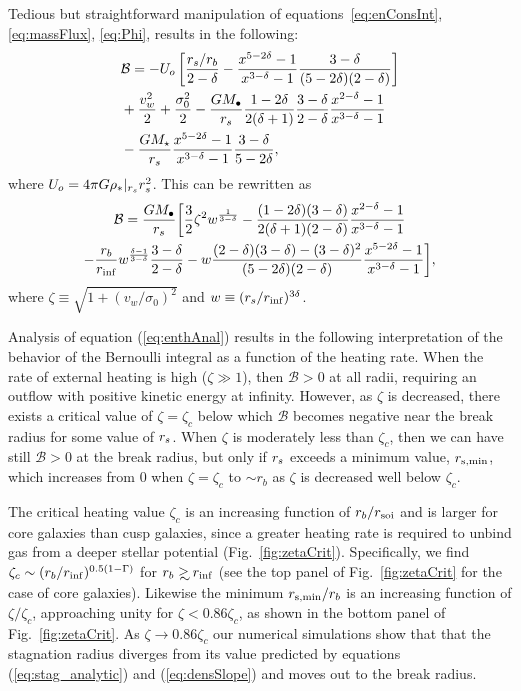 Tedious but straightforward manipulation of equations~\eqref{eq:enConsInt}, \eqref{eq:massFlux}, \eqref{eq:Phi}, results in the following:
\begin{align}
  &\mathcal{B} = -U_o\left[\frac{r_s/r_b}{2-\delta}-\frac{x^{5-2\delta}-1}{x^{3-\delta}-1}\frac{3-\delta}{(5-2\delta)(2-\delta)}\right]\nonumber\\
  &+\frac{v_w^2}{2}+\frac{\sigma_0^2}{2}- \frac{G M_{\bullet}}{r_s}
  \frac{1-2\delta}{2(\delta+1)}
  \frac{3-\delta}{2-\delta}\frac{x^{2-\delta}-1}{x^{3-\delta}-1}
  \nonumber\\
  &-\frac{G M_\star}{r_s}
  \frac{x^{5-2\delta}-1}{x^{3-\delta}-1}\frac{3-\delta}{5-2\delta},
\end{align}
where $U_o=4 \pi G \rho_*|_{r_s} r_s^2$.  This can be rewritten as
\begin{multline}
  \mathcal{B} =\frac{G M_{\bullet}}{r_s} \biggl[ \frac{3}{2} \zeta^2
  w^{\frac{1}{3 -\delta}}
  -\frac{(1-2\delta)(3-\delta)}{2(\delta+1)(2-\delta)}  \frac{x^{2  -\delta}-1}{x^{3-\delta}-1}\\
  -\frac{r_b}{r_{\rm inf}} w^{\frac{\delta-1}{3-\delta}} \frac{3 -\delta}{2
    -\delta} -w
  \frac{(2-\delta)(3-\delta)-(3-\delta)^{2}}{(5-2\delta)(2-\delta)}
  \frac{x^{5-2\delta}-1}{x^{3-\delta}-1} \biggr],
\label{eq:enthAnal}
\end{multline}
where $\zeta \equiv \sqrt{1 + (v_w/\sigma_0)^2}$ and $w\equiv
(r_s/r_{\rm inf})^{3\delta}$.

Analysis of equation (\ref{eq:enthAnal}) results in the following interpretation of the behavior of the Bernoulli integral as a function of the heating rate.  When the rate of external heating is high ($\zeta \gg 1$), then $\mathcal{B} > 0$ at all radii, requiring an outflow with positive kinetic energy at infinity.  However, as $\zeta$ is decreased, there exists a critical value of $\zeta = \zeta_{c}$ below which $\mathcal{B}$ becomes negative near the break radius for some value of $r_s$.  When $\zeta$ is moderately less than $\zeta_c$, then we can have still $\mathcal{B} > 0$ at the break radius, but only if $r_s$ exceeds a minimum value, $r_{\rm s,min}$, which increases from 0 when $\zeta = \zeta_c$ to $\sim r_{b}$ as $\zeta$ is decreased well below $\zeta_c$.

The critical heating value $\zeta_c$ is an increasing function of $r_{b}/r_{\rm soi}$ and is larger for core galaxies than cusp galaxies, since a greater heating rate is required to unbind gas from a deeper stellar potential (Fig.~\ref{fig:zetaCrit}).  Specifically, we find $\zeta_c\sim (r_b/r_{\rm inf})^{0.5(1-\Gamma)}$ for $\rb\gsim\rsoi$ (see the top panel of Fig.~\ref{fig:zetaCrit} for the case of core galaxies). Likewise the minimum $r_{\rm s,min}/r_{b}$ is an increasing function of $\zeta/\zeta_{c}$, approaching unity for $\zeta < 0.86\zeta_c$, as shown in the bottom panel of Fig.~\ref{fig:zetaCrit}.  As $\zeta \rightarrow 0.86\zeta_c$ our numerical simulations show that that the stagnation radius diverges from its value predicted by equations (\ref{eq:stag_analytic}) and (\ref{eq:densSlope}) and moves out to the break radius.  


